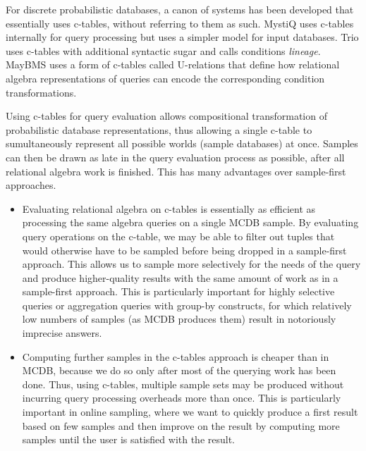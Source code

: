 For discrete probabilistic  databases, a canon of systems has been developed that essentially uses  c-tables, without referring to them as such. MystiQ  \cite{dalvi07efficient}  uses  c-tables internally  for  query processing  but  uses  a  simpler  model for  input  databases.   Trio \cite{WidomTrio2008}  uses  c-tables with  additional  syntactic sugar  and calls conditions {\em lineage}\/.  MayBMS \cite{AJKO2008}  uses a  form of  c-tables called  U-relations that define how relational algebra representations of queries can encode the corresponding condition transformations.


Using c-tables  for  query evaluation  allows  compositional  transformation of probabilistic  database representations, thus allowing a single c-table to sumultaneously represent  all possible worlds  (sample databases) at once. Samples can then be drawn as late in the query evaluation process as possible,  after all relational algebra work is finished. This has  many advantages over  sample-first approaches.
\begin{itemize}
\addtolength{\topsep}{-0.3ex}
\addtolength{\labelsep}{-0.3ex}
\addtolength{\itemsep}{-1ex}
\item
Evaluating relational algebra on c-tables is  essentially as efficient as processing  the same algebra queries on a  single  MCDB  sample. By evaluating query operations on  the c-table, we may be able  to filter out tuples that would otherwise have to be  sampled before being dropped  in a sample-first approach.  This allows us  to sample more selectively  for the needs of  the query and produce higher-quality results with  the same amount of work as in a sample-first approach. This  is particularly important for highly  selective queries or aggregation queries with group-by constructs, for which relatively low numbers   of   samples   (as   MCDB   produces   them) result in notoriously imprecise answers.

\item
Computing further samples in the c-tables approach is  cheaper than in  MCDB, because  we do  so only  after most  of the querying  work  has been  done.   Thus,  using  c-tables, multiple sample sets may be produced without incurring query processing overheads more than once.  This is particularly important in online  sampling, where we want to  quickly produce  a first  result based on few samples and then  improve on the result by computing more samples until the user is satisfied with the result.

\end{itemize}


